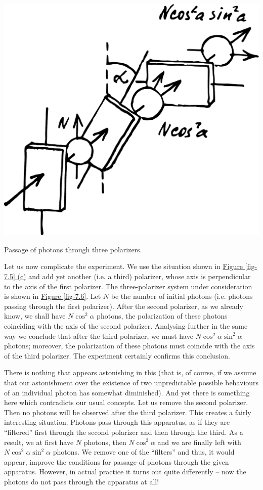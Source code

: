 \documentclass[a4paper,sfsidenotes,colorlinks=true]{tufte-book}
\numberwithin{equation}{section}
\numberwithin{figure}{section}
\begin{document}
\begin{marginfigure}[1cm]
\centering
\includegraphics[width=\textwidth]{figures/fig-07-06.pdf}
\caption{Passage of photons through three polarizers.}
\label{fig-7.6}
\end{marginfigure}

Let us now complicate the experiment. We use the situation shown in \hyperref[fig-7.5]{Figure \ref{fig-7.5} (c)} and add yet another (i.e. a third) polarizer, whose axis is perpendicular to the axis of the first polarizer. The three-polarizer system under consideration is shown in \hyperref[fig-7.6]{Figure \ref{fig-7.6}}. Let $N$ be the number of initial photons (i.e. photons passing through the first polarizer). After the second polarizer, as we already know, we shall have $N \cos^{2} \alpha$ photons, the polarization of these photons coinciding with the axis of the second polarizer. Analysing further in the same way	we conclude that after the third polarizer, we must have $N \cos^{2} \alpha \sin^{2} \alpha$ photons; moreover, the polarization of these photons must
coincide with the axis of the third polarizer. The experiment certainly confirms this conclusion. 


There is nothing that appears astonishing in this (that is, of course, if we assume that our astonishment over the existence of two unpredictable possible behaviours of an individual photon has somewhat diminished). And yet there is something here which contradicts our usual concepts. Let us remove the second polarizer. Then no photons will be observed after the third polarizer. This creates a fairly interesting situation. Photons pass through this apparatus, as if they are ``filtered'' first through the second polarizer and then through the third. As a result, we at first have $N$ photons, then $N \cos^{2} \alpha$	and we are finally left with $N \cos^{2} \alpha \sin^{2} \alpha$ photons. We remove one of the ``filters'' and thus, it would appear, improve the conditions for passage of photons through the given apparatus. However, in actual practice it turns out quite differently -- now the photons do not pass through the apparatus at all!
\end{document}
